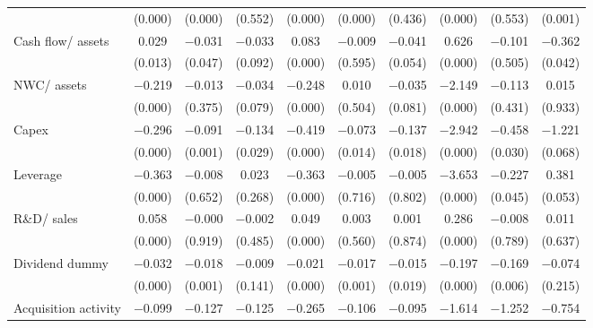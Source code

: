 \begin{longtable}{l*{9}{c}}
                    &     (0.000)&     (0.000)&     (0.552)&     (0.000)&     (0.000)&     (0.436)&     (0.000)&     (0.553)&     (0.001)\\
\addlinespace
Cash flow/ assets   &       0.029&    $-$0.031&    $-$0.033&       0.083&    $-$0.009&    $-$0.041&       0.626&    $-$0.101&    $-$0.362\\
                    &     (0.013)&     (0.047)&     (0.092)&     (0.000)&     (0.595)&     (0.054)&     (0.000)&     (0.505)&     (0.042)\\
\addlinespace
NWC/ assets         &    $-$0.219&    $-$0.013&    $-$0.034&    $-$0.248&       0.010&    $-$0.035&    $-$2.149&    $-$0.113&       0.015\\
                    &     (0.000)&     (0.375)&     (0.079)&     (0.000)&     (0.504)&     (0.081)&     (0.000)&     (0.431)&     (0.933)\\
\addlinespace
Capex               &    $-$0.296&    $-$0.091&    $-$0.134&    $-$0.419&    $-$0.073&    $-$0.137&    $-$2.942&    $-$0.458&    $-$1.221\\
                    &     (0.000)&     (0.001)&     (0.029)&     (0.000)&     (0.014)&     (0.018)&     (0.000)&     (0.030)&     (0.068)\\
\addlinespace
Leverage            &    $-$0.363&    $-$0.008&       0.023&    $-$0.363&    $-$0.005&    $-$0.005&    $-$3.653&    $-$0.227&       0.381\\
                    &     (0.000)&     (0.652)&     (0.268)&     (0.000)&     (0.716)&     (0.802)&     (0.000)&     (0.045)&     (0.053)\\
\addlinespace
R\&D/ sales         &       0.058&    $-$0.000&    $-$0.002&       0.049&       0.003&       0.001&       0.286&    $-$0.008&       0.011\\
                    &     (0.000)&     (0.919)&     (0.485)&     (0.000)&     (0.560)&     (0.874)&     (0.000)&     (0.789)&     (0.637)\\
\addlinespace
Dividend dummy      &    $-$0.032&    $-$0.018&    $-$0.009&    $-$0.021&    $-$0.017&    $-$0.015&    $-$0.197&    $-$0.169&    $-$0.074\\
                    &     (0.000)&     (0.001)&     (0.141)&     (0.000)&     (0.001)&     (0.019)&     (0.000)&     (0.006)&     (0.215)\\
\addlinespace
Acquisition activity&    $-$0.099&    $-$0.127&    $-$0.125&    $-$0.265&    $-$0.106&    $-$0.095&    $-$1.614&    $-$1.252&    $-$0.754\\

\end{longtable}
